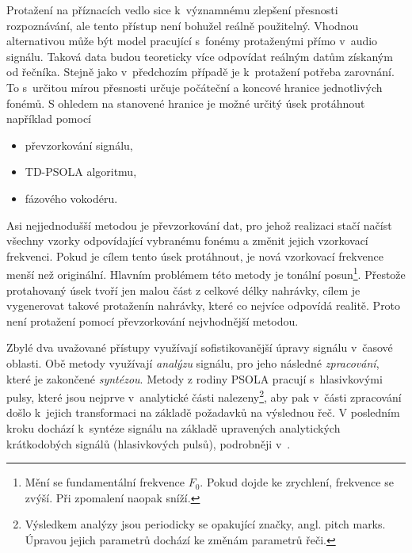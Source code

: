 Protažení na příznacích vedlo sice  k~významnému zlepšení přesnosti rozpoznávání, ale tento přístup není bohužel reálně použitelný. Vhodnou alternativou může být model pracující s~fonémy protaženými přímo v~audio signálu.
Taková data budou teoreticky více odpovídat reálným datům získaným od řečníka.
Stejně jako v~předchozím případě je  k~protažení potřeba zarovnání.
To s~určitou mírou přesnosti určuje počáteční a koncové hranice jednotlivých fonémů.
S ohledem na stanovené hranice je možné určitý úsek protáhnout například pomocí

\begin{itemize}
  \item převzorkování signálu,
  \item TD-PSOLA algoritmu,
  \item fázového vokodéru.
\end{itemize}

\noindent Asi nejjednodušší metodou je převzorkování dat, pro jehož realizaci stačí načíst všechny vzorky odpovídající vybranému fonému a změnit jejich vzorkovací frekvenci.
Pokud je cílem tento úsek protáhnout, je nová vzorkovací frekvence menší než originální. Hlavním problémem této metody je tonální posun\footnote{Mění se fundamentální frekvence $F_0$. Pokud dojde ke zrychlení, frekvence se zvýší. Při zpomalení naopak sníží.}.
Přestože protahovaný úsek tvoří jen malou část z celkové délky nahrávky, cílem je vygenerovat takové protaženín nahrávky, které co nejvíce odpovídá realitě.
Proto není protažení pomocí převzorkování nejvhodnější metodou.

Zbylé dva uvažované přístupy využívají sofistikovanější úpravy signálu v~časové oblasti.
Obě metody využívají \textit{analýzu} signálu, pro jeho následné \textit{zpracování}, které je zakončené \textit{syntézou}.
Metody z rodiny PSOLA pracují s~hlasivkovými pulsy, které jsou nejprve v~analytické části nalezeny\footnote{Výsledkem analýzy jsou periodicky se opakující značky, angl. pitch marks. Úpravou jejich parametrů dochází ke změnám parametrů řeči.}, aby pak v~části zpracování došlo  k~jejich transformaci na základě požadavků na výslednou řeč.
V posledním kroku dochází k~syntéze signálu na základě upravených analytických krátkodobých signálů (hlasivkových pulsů), podrobněji v~\cite{Psutka2006}.

